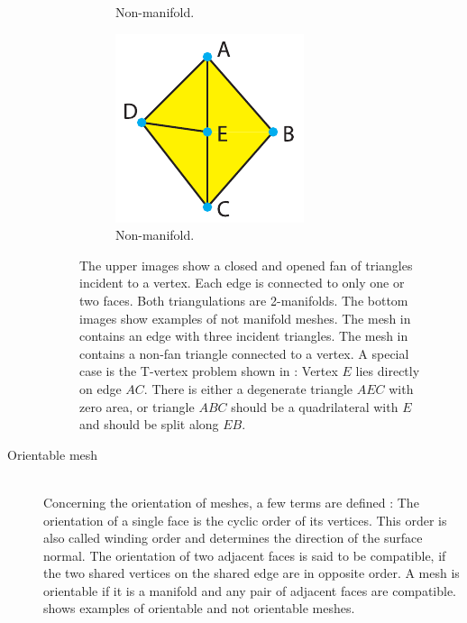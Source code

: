 \begin{description}
\begin{figure}[H]
\begin{subfigure}[t]{0.32\textwidth}
			\caption{
				Non-manifold.
			}
			\label{fig:non_manifold_vertex}
		\end{subfigure}
		\begin{subfigure}[t]{0.32\textwidth}
			\centering
			\includegraphics[width=\textwidth]{images/t_vertex}
			\caption{
				Non-manifold.
				}
			\label{fig:t_vertex}
		\end{subfigure}
		\caption[Manifold meshes]{
			The upper images show a closed and opened fan of triangles incident to a vertex.
			Each edge is connected to only one or two faces.
			Both triangulations are 2-manifolds.
			The bottom images show examples of not manifold meshes.
			The mesh in  contains an edge with three incident triangles.
			The mesh in  contains a non-fan triangle connected to a vertex.
			A special case is the T-vertex problem shown in :
			Vertex $E$ lies directly on edge $AC$.
			There is either a degenerate triangle $AEC$ with zero area, or triangle $ABC$ should be a quadrilateral with $E$ and should be split along $EB$.
		}
		\label{fig:manifold}
	\end{figure}


	\item[Orientable mesh] \hfill \\
	Concerning the orientation of meshes, a few terms are defined \cite{mesh_basics}:
	The orientation of a single face is the cyclic order of its vertices.
	This order is also called winding order and determines the direction of the surface normal.
	The orientation of two adjacent faces is said to be compatible, if the two shared vertices on the shared edge are in opposite order.
	A mesh is orientable if it is a manifold and any pair of adjacent faces are compatible.
	 shows examples of orientable and not orientable meshes.


\end{description}
